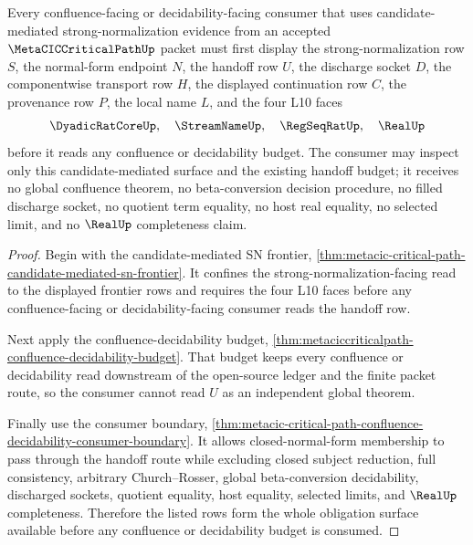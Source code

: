 \begin{theorem}
\label{thm:metacic-confluence-candidate-mediated-sn-obligation-surface}
Every confluence-facing or decidability-facing consumer that uses candidate-mediated strong-normalization evidence from an accepted $\MetaCICCriticalPathUp$ packet must first display the strong-normalization row $S$, the normal-form endpoint $N$, the handoff row $U$, the discharge socket $D$, the componentwise transport row $H$, the displayed continuation row $C$, the provenance row $P$, the local name $L$, and the four L10 faces
$$
\DyadicRatCoreUp,\quad \StreamNameUp,\quad \RegSeqRatUp,\quad \RealUp
$$
before it reads any confluence or decidability budget. The consumer may inspect only this candidate-mediated surface and the existing handoff budget; it receives no global confluence theorem, no beta-conversion decision procedure, no filled discharge socket, no quotient term equality, no host real equality, no selected limit, and no $\RealUp$ completeness claim.
\end{theorem}
\begin{proof}
Begin with the candidate-mediated SN frontier, \autoref{thm:metacic-critical-path-candidate-mediated-sn-frontier}. It confines the strong-normalization-facing read to the displayed frontier rows and requires the four L10 faces before any confluence-facing or decidability-facing consumer reads the handoff row.

Next apply the confluence-decidability budget, \autoref{thm:metaciccriticalpath-confluence-decidability-budget}. That budget keeps every confluence or decidability read downstream of the open-source ledger and the finite packet route, so the consumer cannot read $U$ as an independent global theorem.

Finally use the consumer boundary, \autoref{thm:metacic-critical-path-confluence-decidability-consumer-boundary}. It allows closed-normal-form membership to pass through the handoff route while excluding closed subject reduction, full consistency, arbitrary Church--Rosser, global beta-conversion decidability, discharged sockets, quotient equality, host equality, selected limits, and $\RealUp$ completeness. Therefore the listed rows form the whole obligation surface available before any confluence or decidability budget is consumed.
\end{proof}

